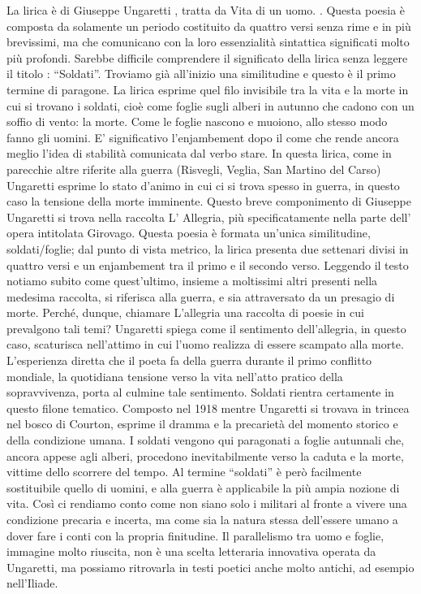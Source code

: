 La lirica è di Giuseppe Ungaretti , tratta da Vita di un uomo. .
Questa poesia è composta da solamente un periodo costituito da quattro versi senza rime e in più brevissimi, ma che comunicano con la loro essenzialità sintattica significati molto più profondi.
Sarebbe difficile comprendere il significato della lirica senza leggere il titolo : “Soldati”.
Troviamo già all’inizio una similitudine e questo è il primo termine di paragone. La lirica esprime quel filo invisibile tra la vita e la morte in cui si trovano i soldati, cioè come foglie sugli alberi in autunno che cadono con un soffio di vento: la morte. Come le foglie nascono e muoiono, allo stesso modo fanno gli uomini.
E’ significativo l’enjambement dopo il come che rende ancora meglio l’idea di stabilità comunicata dal verbo stare.
In questa lirica, come in parecchie altre riferite alla guerra (Risvegli, Veglia, San Martino del Carso) Ungaretti esprime lo stato d’animo in cui ci si trova spesso in guerra, in questo caso la tensione della morte imminente.
Questo breve componimento di Giuseppe Ungaretti  si trova nella raccolta L’ Allegria, più specificatamente nella parte dell’ opera intitolata Girovago. Questa poesia è formata un’unica similitudine, soldati/foglie; dal punto di vista metrico, la lirica presenta due settenari divisi in quattro versi e un enjambement tra il primo e il secondo verso.
Leggendo il testo notiamo subito come quest’ultimo, insieme a moltissimi altri presenti nella medesima raccolta, si riferisca alla guerra, e sia attraversato da un presagio di morte.
Perché, dunque, chiamare L’allegria una raccolta di poesie in cui prevalgono tali temi?
Ungaretti spiega come il sentimento dell’allegria, in questo caso, scaturisca nell’attimo in cui l’uomo realizza di essere scampato alla morte. L’esperienza diretta che il poeta fa della guerra durante il primo conflitto mondiale, la quotidiana tensione verso la vita nell’atto pratico della sopravvivenza, porta al culmine tale sentimento. Soldati rientra certamente in questo filone tematico. Composto nel 1918 mentre Ungaretti si trovava in trincea nel bosco di Courton, esprime il dramma e la precarietà del momento storico e della condizione umana. I soldati vengono qui paragonati a foglie autunnali che, ancora appese agli alberi, procedono inevitabilmente verso la caduta e la morte, vittime dello scorrere del tempo.
Al termine “soldati” è però facilmente sostituibile quello di uomini, e alla guerra è applicabile la più ampia nozione di vita. Così ci rendiamo conto come non siano solo i militari al fronte a vivere una condizione precaria e incerta, ma come sia la natura stessa dell’essere umano a dover fare i conti con la propria finitudine.
Il parallelismo tra uomo e foglie, immagine molto riuscita, non è una scelta letteraria innovativa operata da Ungaretti, ma possiamo ritrovarla in testi poetici anche molto antichi, ad esempio nell’Iliade.

